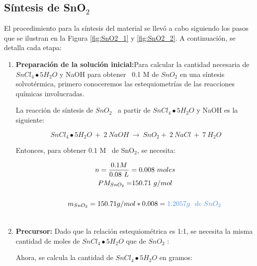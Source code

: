 \documentclass[12pt]{article}
\begin{document}
        
        \subsection{Síntesis de SnO$\displaystyle _{2}$ }
        El procedimiento para la síntesis del material se llevó a cabo siguiendo los pasos que se ilustran en la Figura \ref{fig:SnO2_1} y \ref{fig:SnO2_2}. A continuación, se detalla cada etapa: 


        \begin{enumerate}
        \item\textbf{Preparación de la solución inicial:}Para calcular la cantidad necesaria de $\displaystyle SnCl_{4} \smblkcircle 5H_{2} O$ y NaOH para obtener \ 0.1 M de $\displaystyle SnO_{2}$ en una síntesis solvotérmica, primero conoceremos las estequiometrías de las reacciones químicas involucradas.
        
        La reacción de síntesis de $\displaystyle SnO_{2}$ \ a partir de $\displaystyle SnCl_{4} \smblkcircle 5H_{2} O$ y NaOH es la siguiente:
        
        \begin{equation}
        \ {\displaystyle SnCl_{4} \smblkcircle 5H_{2} O} \ +\ 2\ NaOH\ \rightarrow \ {\displaystyle SnO_{2}} +\ 2\ NaCl\ +\ 7\ {\displaystyle H_{2} O}
        \end{equation}

        Entonces, para obtener 0.1 M \ de SnO$\displaystyle _{2}$, se necesita:
        
        \begin{gather}
        n=\frac{0.1M}{0.08\ L} =0.008\ moles\\
        {\displaystyle PM_{SnO_{2}} =} 150.71\ g/mol\\
        \ \ \ \ \ \ \ \  \notag\\
        \ \ \ \ \ \ \ \ {\displaystyle m_{SnO_{2}} =150.71g/mol*0.008=\textcolor[rgb]{0.29,0.56,0.89}{1.2057g\ \ de\ SnO_{2}}}\\
         \notag
        \end{gather}
        
        
        \item\textbf{Precursor:} Dado que la relación estequiométrica es 1:1, se necesita la misma cantidad de moles de $\displaystyle SnCl_{4} \smblkcircle 5H_{2} O$ que de $\displaystyle SnO_{2}$ :
        
        Ahora, se calcula la cantidad de $\displaystyle SnCl_{4} \smblkcircle 5H_{2} O$ en gramos:
       

\end{enumerate}
\end{document}
